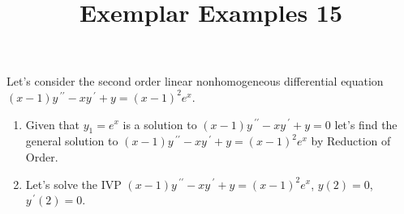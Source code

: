 \documentclass{ximera}
\begin{document}
\begin{abstract}
 \end{abstract}

    \title{Exemplar Examples 15}
    
    \maketitle

    Let's consider the second order linear nonhomogeneous differential equation $(x-1)y\,^{\prime\prime}-x y\,^{\prime}+y=(x-1)^2e^{x}$.

\begin{enumerate}

\item Given that $y_1=e^x$ is a solution to $(x-1)y\,^{\prime\prime}-x y\,^{\prime}+y=0$ let's find the general solution to $(x-1)y\,^{\prime\prime}-x y\,^{\prime}+y=(x-1)^2e^{x}$ by Reduction of Order.





\newpage


\item Let's solve the IVP $(x-1)y\,^{\prime\prime}-x y\,^{\prime}+y=(x-1)^2e^{x}$, $y(2)=0$, $y^{\,\prime}(2)=0$.



\end{enumerate}
\end{document}
